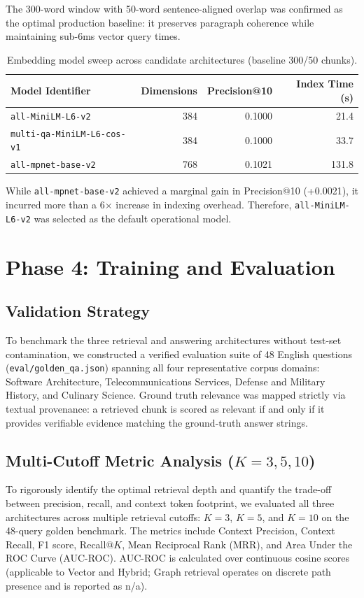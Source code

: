 \documentclass[11pt,a4paper]{article}
\begin{document}
The 300-word window with 50-word sentence-aligned overlap was confirmed as the optimal production baseline: it preserves paragraph coherence while maintaining sub-6ms vector query times.

\begin{table}[H]
\centering
\caption{Embedding model sweep across candidate architectures (baseline 300/50 chunks).}
\begin{tabular}{lrrr}
\toprule
\textbf{Model Identifier} & \textbf{Dimensions} & \textbf{Precision@10} & \textbf{Index Time (s)} \\
\midrule
\texttt{all-MiniLM-L6-v2} & 384 & 0.1000 & 21.4 \\
\texttt{multi-qa-MiniLM-L6-cos-v1} & 384 & 0.1000 & 33.7 \\
\texttt{all-mpnet-base-v2} & 768 & 0.1021 & 131.8 \\
\bottomrule
\end{tabular}
\end{table}

While \texttt{all-mpnet-base-v2} achieved a marginal gain in Precision@10 (+0.0021), it incurred more than a 6$\times$ increase in indexing overhead. Therefore, \texttt{all-MiniLM-L6-v2} was selected as the default operational model.

\section{Phase 4: Training and Evaluation}

\subsection{Validation Strategy}
To benchmark the three retrieval and answering architectures without test-set contamination, we constructed a verified evaluation suite of 48 English questions (\texttt{eval/golden\_qa.json}) spanning all four representative corpus domains: Software Architecture, Telecommunications Services, Defense and Military History, and Culinary Science. Ground truth relevance was mapped strictly via textual provenance: a retrieved chunk is scored as relevant if and only if it provides verifiable evidence matching the ground-truth answer strings.

\subsection{Multi-Cutoff Metric Analysis ($K = 3, 5, 10$)}
To rigorously identify the optimal retrieval depth and quantify the trade-off between precision, recall, and context token footprint, we evaluated all three architectures across multiple retrieval cutoffs: $K = 3$, $K = 5$, and $K = 10$ on the 48-query golden benchmark. The metrics include Context Precision, Context Recall, F1 score, Recall@$K$, Mean Reciprocal Rank (MRR), and Area Under the ROC Curve (AUC-ROC). AUC-ROC is calculated over continuous cosine scores (applicable to Vector and Hybrid; Graph retrieval operates on discrete path presence and is reported as n/a).
\end{document}
